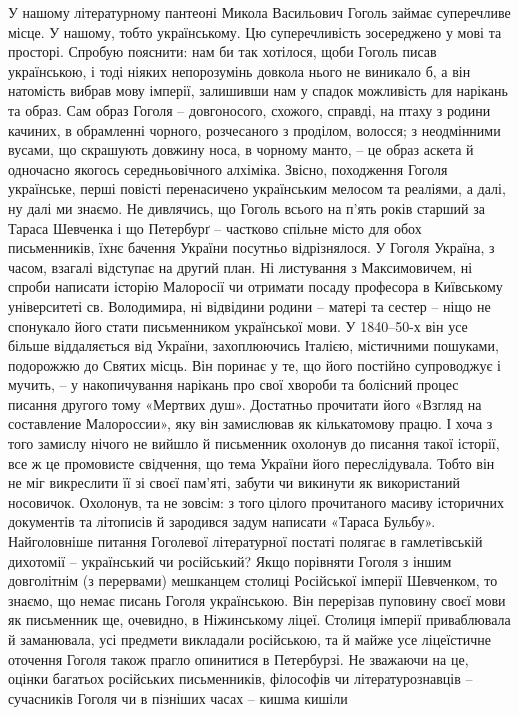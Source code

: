 У нашому літературному пантеоні Микола Васильович Гоголь
займає суперечливе місце. У нашому, тобто українському. Цю суперечливість
зосереджено у мові та просторі. Спробую пояснити: нам би так хотілося, щоби
Гоголь писав українською, і тоді ніяких непорозумінь довкола нього не виникало
б, а він натомість вибрав мову імперії, залишивши нам у спадок можливість для
нарікань та образ. Сам образ Гоголя – довгоносого, схожого, справді, на птаху з
родини качиних, в обрамленні чорного, розчесаного з проділом, волосся; з
неодмінними вусами, що скрашують довжину носа, в чорному манто, – це образ
аскета й одночасно якогось середньовічного алхіміка. Звісно, походження Гоголя
українське, перші повісті перенасичено українським мелосом та реаліями, а далі,
ну далі ми знаємо. Не дивлячись, що Гоголь всього на п’ять років старший за
Тараса Шевченка і що Петербурґ – частково спільне місто для обох письменників,
їхнє бачення України посутньо відрізнялося. У Гоголя Україна, з часом, взагалі
відступає на другий план. Ні листування з Максимовичем, ні спроби написати
історію Малоросії чи отримати посаду професора в Київському університеті св.
Володимира, ні відвідини родини – матері та сестер – ніщо не спонукало його
стати письменником української мови. У 1840–50-х він усе більше віддаляється
від України, захоплюючись Італією, містичними пошуками, подорожжю до Святих
місць. Він поринає у те, що його постійно супроводжує і мучить, – у
накопичування нарікань про свої хвороби та болісний процес писання другого тому
«Мертвих душ». Достатньо прочитати його «Взгляд на составление Малороссии», яку
він замислював як кількатомову працю. І хоча з того замислу нічого не вийшло й
письменник охолонув до писання такої історії, все ж це промовисте свідчення, що
тема України його переслідувала. Тобто він не міг викреслити її зі своєї
пам’яті, забути чи викинути як використаний носовичок. Охолонув, та не зовсім:
з того цілого прочитаного масиву історичних документів та літописів й зародився
задум написати «Тараса Бульбу». Найголовніше питання Гоголевої літературної
постаті полягає в гамлетівській дихотомії – український чи російський? Якщо
порівняти Гоголя з іншим довголітнім (з перервами) мешканцем столиці Російської
імперії Шевченком, то знаємо, що немає писань Гоголя українською. Він перерізав
пуповину своєї мови як письменник ще, очевидно, в Ніжинському ліцеї. Столиця
імперії приваблювала й заманювала, усі предмети викладали російською, та й
майже усе ліцеїстичне оточення Гоголя також прагло опинитися в Петербурзі. Не
зважаючи на це, оцінки багатьох російських письменників, філософів чи
літературознавців – сучасників Гоголя чи в пізніших часах – кишма кишіли
